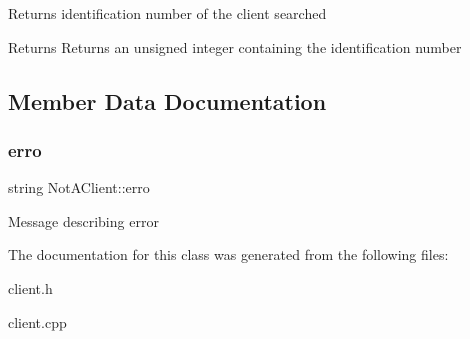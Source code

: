 Returns identification number of the client searched

\begin{DoxyReturn}{Returns}
Returns an unsigned integer containing the identification number 
\end{DoxyReturn}


\subsection{Member Data Documentation}
\mbox{\label{class_not_a_client_a5a7444300559fedd328e401de04fff79}} 
\subsubsection{\texorpdfstring{erro}{erro}}
{\footnotesize\ttfamily string Not\+A\+Client\+::erro}

Message describing error 

The documentation for this class was generated from the following files\+:\begin{DoxyCompactItemize}
\item 
client.\+h\item 
client.\+cpp\end{DoxyCompactItemize}
